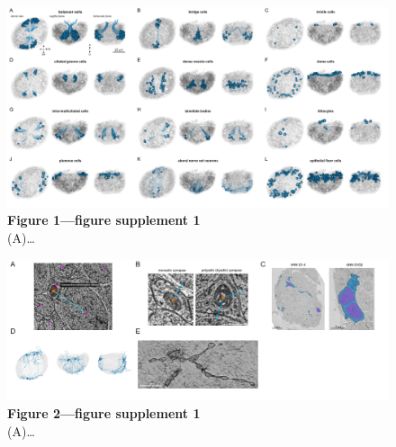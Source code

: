 \documentclass[
  11pt,
]{article}
\begin{document}
\begin{figure}[H]

{\centering \includegraphics{figures/Figure1_Supplement1.png}

}

\caption{\textbf{Figure 1---figure supplement 1}\\
(A)\ldots{}}

\end{figure}%
\begin{figure}[H]

{\centering \includegraphics{figures/Figure2_Supplement1.png}

}

\caption{\textbf{Figure 2---figure supplement 1}\\
(A)\ldots{}}

\end{figure}%
\end{document}
